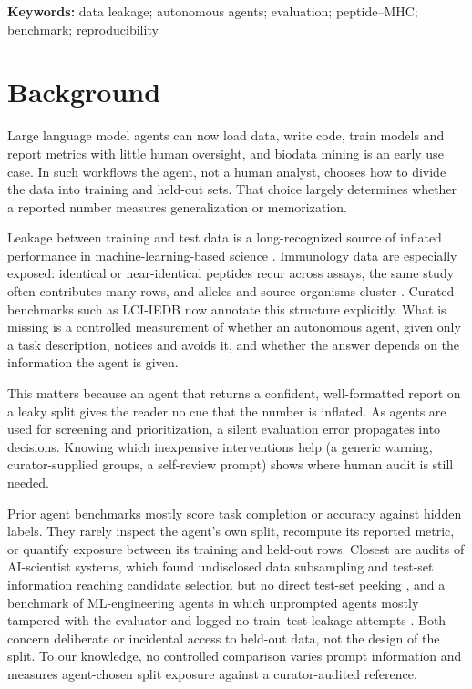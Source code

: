 \documentclass[11pt,a4paper]{article}
\begin{document}
\noindent\textbf{Keywords:} data leakage; autonomous agents; evaluation; peptide--MHC; benchmark; reproducibility

\clearpage

\section*{Background}
Large language model agents can now load data, write code, train models and report metrics with little human oversight, and biodata mining is an early use case. In such workflows the agent, not a human analyst, chooses how to divide the data into training and held-out sets. That choice largely determines whether a reported number measures generalization or memorization.

Leakage between training and test data is a long-recognized source of inflated performance in machine-learning-based science \cite{Kapoor2023}. Immunology data are especially exposed: identical or near-identical peptides recur across assays, the same study often contributes many rows, and alleles and source organisms cluster \cite{Vita2019}. Curated benchmarks such as LCI-IEDB now annotate this structure explicitly. What is missing is a controlled measurement of whether an autonomous agent, given only a task description, notices and avoids it, and whether the answer depends on the information the agent is given.

This matters because an agent that returns a confident, well-formatted report on a leaky split gives the reader no cue that the number is inflated. As agents are used for screening and prioritization, a silent evaluation error propagates into decisions. Knowing which inexpensive interventions help (a generic warning, curator-supplied groups, a self-review prompt) shows where human audit is still needed.

Prior agent benchmarks mostly score task completion or accuracy against hidden labels. They rarely inspect the agent's own split, recompute its reported metric, or quantify exposure between its training and held-out rows. Closest are audits of AI-scientist systems, which found undisclosed data subsampling and test-set information reaching candidate selection but no direct test-set peeking \cite{Luo2025}, and a benchmark of ML-engineering agents in which unprompted agents mostly tampered with the evaluator and logged no train--test leakage attempts \cite{Atinafu2026}. Both concern deliberate or incidental access to held-out data, not the design of the split. To our knowledge, no controlled comparison varies prompt information and measures agent-chosen split exposure against a curator-audited reference.
\end{document}
